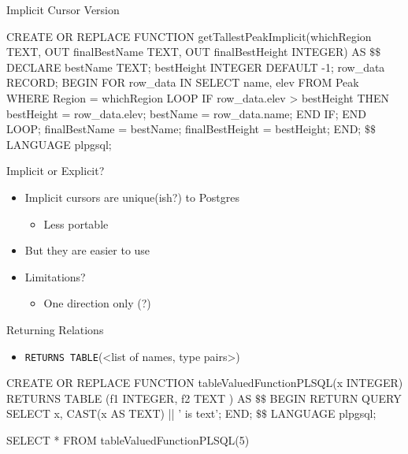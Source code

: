 \documentclass[aspectratio=169]{beamer}
\newenvironment{noindentitemize}
{ \begin{itemize}
 \setlength{\itemsep}{1.5ex}
  \setlength{\parsep}{0pt}   
  \setlength{\parskip}{0pt}
 \addtolength{\leftskip}{-2em}
 }
{ \end{itemize} }
\newenvironment{noindentitemize2}
{ \begin{itemize}
  \setlength{\itemsep}{0ex}
  \setlength{\parskip}{0pt}
  \setlength{\parsep}{0pt}   
  \addtolength{\leftskip}{-2em}  }
{ \end{itemize} }
\begin{document}
\begin{frame}[fragile]{Implicit Cursor Version}

\begin{SQL}
CREATE OR REPLACE FUNCTION  
   getTallestPeakImplicit(whichRegion TEXT, OUT finalBestName TEXT, 
      OUT finalBestHeight INTEGER)  AS
$\textbf{\$\$}$
DECLARE 
   bestName TEXT;
   bestHeight INTEGER DEFAULT -1;
   row_data RECORD;
BEGIN
  FOR row_data IN SELECT name, elev FROM Peak WHERE Region = whichRegion
  LOOP
      IF row_data.elev > bestHeight THEN
        bestHeight = row_data.elev;
        bestName = row_data.name;
      END IF;
  END LOOP;
  finalBestName = bestName;
  finalBestHeight = bestHeight;
END;
$\textbf{\$\$}$
LANGUAGE plpgsql;
\end{SQL}
\end{frame}


\begin{frame}{Implicit or Explicit?}
\begin{noindentitemize}
\item Implicit cursors are unique(ish?) to Postgres
	\begin{noindentitemize2}
	\item Less portable
	\end{noindentitemize2}
\item But they are easier to use
	\item Limitations?
	\begin{noindentitemize2}
	 \item One direction only (?)
	\end{noindentitemize2}
\end{noindentitemize}

\end{frame}

\begin{frame}[fragile]{Returning Relations}

\begin{noindentitemize}
	\item \texttt{RETURNS TABLE}(<list of names, type pairs>)
\end{noindentitemize}

\begin{SQL}
CREATE OR REPLACE FUNCTION  
   tableValuedFunctionPLSQL(x INTEGER)
   RETURNS TABLE (f1 INTEGER, f2 TEXT ) AS
$\textbf{\$\$}$
BEGIN
	RETURN QUERY SELECT x, CAST(x AS TEXT) || ' is text';
END;
$\textbf{\$\$}$
LANGUAGE plpgsql;

SELECT * FROM tableValuedFunctionPLSQL(5)
\end{SQL}

\end{frame}
\end{document}
